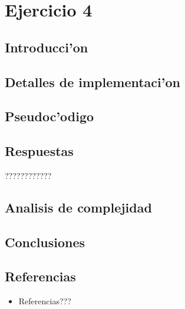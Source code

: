 \newpage
\section{Ejercicio 4}

\subsection{Introducci'on}


\subsection{Detalles de implementaci'on}


\subsection{Pseudoc'odigo}


\subsection{Respuestas}
????????????

\subsection{Analisis de complejidad}


\subsection{Conclusiones}


\subsection{Referencias}
\begin{itemize}
    \item Referencias???
\end{itemize}

